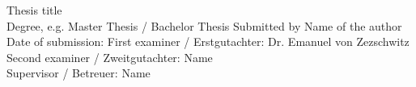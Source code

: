 \vspace{\fill} 
Thesis title \\
Degree, e.g. Master Thesis / Bachelor Thesis 
\newline
\newline
\newline
Submitted by Name of the author \\
Date of submission: 
\newline
\newline
First examiner / Erstgutachter: Dr. Emanuel von Zezschwitz\\
Second examiner / Zweitgutachter: Name\\
Supervisor / Betreuer: Name
